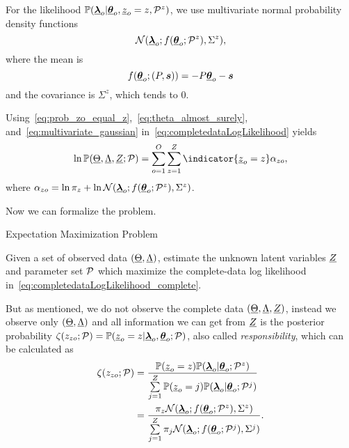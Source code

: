 \documentclass{ifacconf}  %
\begin{document}
For the likelihood $\mathbb{P}({\underline{\boldsymbol{\lambda}}}_{o}|{\underline{\boldsymbol{\theta}}}_{o},\underline{z}_{o}=z,\mathcal{P}^{z})$, we use multivariate normal probability density functions
\begin{equation}
  \label{eq:multivariate_gaussian}
\mathcal{N}({\underline{\boldsymbol{\lambda}}}_{o};f({\underline{\boldsymbol{\theta}}}_{o};\mathcal{P}^{z}),{\Sigma^{z}}),
\end{equation}
where the mean is
\[f({\underline{\boldsymbol{\theta}}}_{o};(P,\boldsymbol{s}))=-{P}{\underline{\boldsymbol{\theta}}}_{o}-{\boldsymbol{s}}\]
and the covariance is ${\Sigma^{z}}$, which tends to $0$.

Using~\eqref{eq:prob_zo_equal_z},~\eqref{eq:theta_almost_surely}, and~\eqref{eq:multivariate_gaussian} in~\eqref{eq:completedataLogLikelihood} yields
\begin{equation}\label{eq:completedataLogLikelihood_complete}
\ln\probability{\random{\Theta},\random{\Lambda},\random{Z};\set{P}}=  \sum_{o=1}^{O}\sum_{z=1}^{Z}{\indicator{\random{z}_{o}=z}}
  \alpha_{zo},
\end{equation}
where ${\alpha_{zo}=\ln{\pi_{z}}+\ln{\mathcal{N}({\underline{\boldsymbol{\lambda}}}_{o};f({\underline{\boldsymbol{\theta}}}_{o};\mathcal{P}^{z}),{\Sigma^{z}})}}$.

Now we can formalize the \EM{} problem.
\begin{problem}{Expectation Maximization Problem}\label{pb:EM}

  Given a set of observed data $(\underline{\Theta},\underline{\Lambda})$, estimate the unknown latent variables $\underline{Z}$ and parameter set $\mathcal{P}$ which maximize the complete-data log likelihood in~\eqref{eq:completedataLogLikelihood_complete}.
\end{problem}


But as mentioned, we do not observe the complete data $(\underline{\Theta},\underline{\Lambda},\underline{Z})$, instead we observe only $(\underline{\Theta},\underline{\Lambda})$ and all information we can get from $\underline{Z}$ is the posterior probability  ${\zeta(z_{zo};\mathcal{P})=\mathbb{P}(\underline{z}_{o}=z|{\underline{\boldsymbol{\lambda}}}_{o},{\underline{\boldsymbol{\theta}}}_{o};\mathcal{P})}$, also called \emph{responsibility}, which can be calculated as
\begin{align}
  \label{eq:responsibilities}
\zeta(z_{zo};\mathcal{P})&=\frac{\mathbb{P}(\underline{z}_{o}=z)\mathbb{P}({\underline{\boldsymbol{\lambda}}}_{o}|{\underline{\boldsymbol{\theta}}}_{o};\mathcal{P}^{z})}{\sum\limits_{j=1}^{Z}\mathbb{P}(\underline{z}_{o}=j)\mathbb{P}({\underline{\boldsymbol{\lambda}}}_{o}|{\underline{\boldsymbol{\theta}}}_{o};\mathcal{P}^{j})}\nonumber\\
  &=\frac{\pi_{z}{\mathcal{N}({\underline{\boldsymbol{\lambda}}}_{o};f({\underline{\boldsymbol{\theta}}}_{o};\mathcal{P}^{z}),{\Sigma^{z}})}}{\sum\limits_{j=1}^{Z}\pi_{j}\mathcal{N}({\underline{\boldsymbol{\lambda}}}_{o};f({\underline{\boldsymbol{\theta}}}_{o};\mathcal{P}^{j}),{\Sigma^{j}})}.
\end{align}
\end{document}
